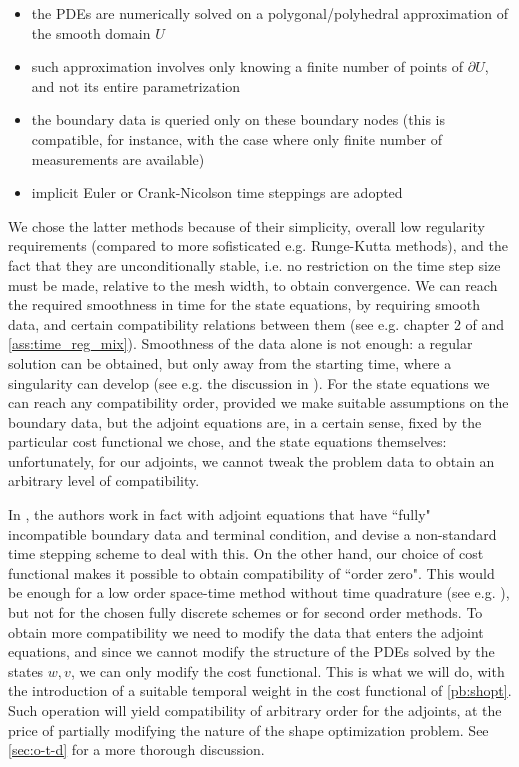 \documentclass[english,a4paper,9pt,oneside]{scrbook}	%
\theoremstyle{break}
\theoremstyle{remark}
\begin{document}
\begin{itemize}
	\item the PDEs are numerically solved on a polygonal/polyhedral approximation of the smooth domain $U$
	\item such approximation involves only knowing a finite number of points of $\partial U$, and not its entire parametrization
	\item the boundary data is queried only on these boundary nodes (this is compatible, for instance, with the case where only finite number of measurements are available)
	\item implicit Euler or Crank-Nicolson time steppings are adopted
\end{itemize}

We chose the latter methods because of their simplicity, overall low regularity requirements (compared to more sofisticated e.g. Runge-Kutta methods), and the fact that they are unconditionally stable, i.e. no restriction on the time step size must be made, relative to the mesh width, to obtain convergence. 
We can reach the required smoothness in time for the state equations, by requiring smooth data, and certain compatibility relations between them (see e.g. chapter 2 of \cite{lions} and \cref{ass:time_reg_mix}). Smoothness of the data alone is not enough: a regular solution can be obtained, but only away from the starting time, where a singularity can develop (see e.g. the discussion in \cite{harbrecht}). For the state equations we can reach any compatibility order, provided we make suitable assumptions on the boundary data, but the adjoint equations are, in a certain sense, fixed by the particular cost functional we chose, and the state equations themselves: unfortunately, for our adjoints, we cannot tweak the problem data to obtain an arbitrary level of compatibility.

In \cite{harbrecht}, the authors work in fact with adjoint equations that have ``fully" incompatible boundary data and terminal condition, and devise a non-standard time stepping scheme to deal with this. On the other hand, our choice of cost functional makes it possible to obtain compatibility of ``order zero". This would be enough for a low order space-time method without time quadrature (see e.g. \cite{vexler}), but not for the chosen fully discrete schemes or for second order methods. To obtain more compatibility we need to modify the data that enters the adjoint equations, and since we cannot modify the structure of the PDEs solved by the states $w,v$, we can only modify the cost functional. This is what we will do, with the introduction of a suitable temporal weight in the cost functional of \cref{pb:shopt}. Such operation will yield compatibility of arbitrary order for the adjoints, at the price of partially modifying the nature of the shape optimization problem. See \cref{sec:o-t-d} for a more thorough discussion.
\end{document}
